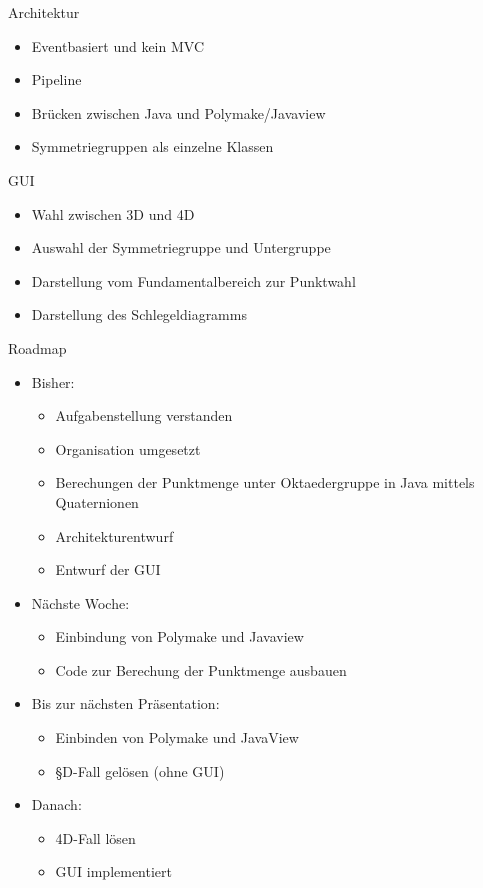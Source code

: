 \documentclass[ucs,11pt]{beamer}
\begin{document}
\begin{frame}{Architektur}
	\begin{itemize}
	\item Eventbasiert und kein MVC
	\item Pipeline
	\item Brücken zwischen Java und Polymake/Javaview
	\item Symmetriegruppen als einzelne Klassen
	\end{itemize}
\end{frame}

\begin{frame}{GUI}
	\begin{itemize}
	\item Wahl zwischen 3D und 4D
	\item Auswahl der Symmetriegruppe und Untergruppe
	\item Darstellung vom Fundamentalbereich zur Punktwahl
	\item Darstellung des Schlegeldiagramms
	\end{itemize}
\end{frame}


\begin{frame}{Roadmap}
  \begin{itemize}
    \item Bisher:
      	\begin{itemize}
        	\item Aufgabenstellung verstanden
	\item Organisation umgesetzt
	\item Berechungen der Punktmenge unter Oktaedergruppe in Java mittels Quaternionen
	\item Architekturentwurf
	\item Entwurf der GUI
     	 \end{itemize}
      \item Nächste Woche:
      	\begin{itemize}
	\item Einbindung von Polymake und Javaview
	\item Code zur Berechung der Punktmenge ausbauen
     	 \end{itemize}
      \item Bis zur nächsten Präsentation:
        	\begin{itemize}
         	 \item Einbinden von Polymake und JavaView
	\item §D-Fall gelösen (ohne GUI)
        	\end{itemize}
      \item Danach:
        	\begin{itemize}
         	 \item 4D-Fall lösen
	\item GUI implementiert
       	 \end{itemize}
  \end{itemize}
\end{frame}
\end{document}

